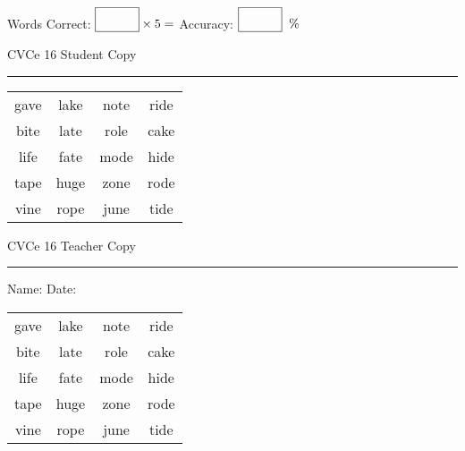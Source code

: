\documentclass{memoir}
\begin{document}
\small

Words Correct: $\fbox{\phantom{\huge 100}} \times 5 = $ Accuracy: $\fbox{\phantom{\huge 100}}\;\; \%$ 

\vfill

\newpage


\footnotesize \noindent
CVCe 16 \hfill Student Copy
\smallskip
\hrule

\Large

\setlength{\tabcolsep}{14pt}
\def\arraystretch{2}

{\selectfont


\begin{vplace}[0.5]
\begin{center}
\begin{tabular}{cccc}
gave & lake & note & ride \\
bite & late & role & cake \\
life & fate & mode & hide \\
tape & huge & zone & rode \\
vine & rope & june & tide \\
\end{tabular}
\end{center}
\end{vplace}

}

\newpage

\footnotesize \noindent
CVCe 16 \hfill Teacher Copy
\smallskip
\hrule

\small

\vfill

\noindent
Name: \underline{\hspace{1.75in}} \hfill Date: \underline{\hspace{1in}}

\Large

{\selectfont


\begin{vplace}[0.5]
\begin{center}
\begin{tabular}{cccc}
gave & lake & note & ride \\
bite & late & role & cake \\
life & fate & mode & hide \\
tape & huge & zone & rode \\
vine & rope & june & tide \\
\end{tabular}
\end{center}
\end{vplace}



}
\end{document}
